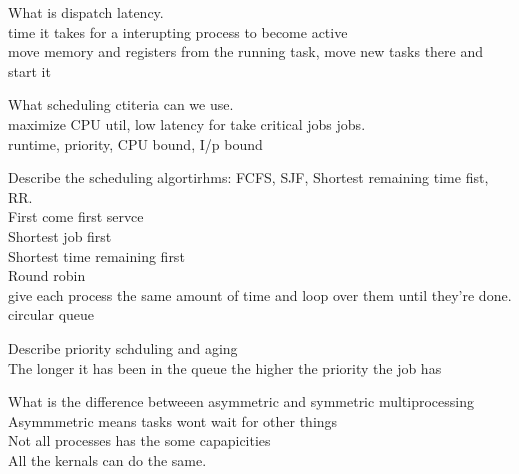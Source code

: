 \documentclass[a4paper,10pt,titlepage]{report}
\begin{document}
\vspace{5mm}

What is dispatch latency.\\
\hspace{10mm} time it takes for a interupting process to become active \\
\hspace{10mm} move memory and registers from the running task, move new tasks there and start it \\
\vspace{5mm}

What scheduling ctiteria can we use.\\
\hspace{10mm} maximize CPU util, low latency for take critical jobs jobs.\\
\hspace{10mm} runtime, priority, CPU bound, I/p bound \\
\vspace{5mm}

Describe the scheduling algortirhms: FCFS, SJF, Shortest remaining time fist, RR.\\
\hspace{10mm} First come first servce\\
\hspace{10mm} Shortest job first \\
\hspace{10mm} Shortest time remaining first \\
\hspace{10mm} Round robin\\
\hspace{10mm}give each process the same amount of time and loop over them until they're done. circular queue\\
\vspace{5mm}


Describe priority schduling and aging\\
\hspace{10mm} The longer it has been in the queue the higher the priority the job has\\
\vspace{5mm}

What is the difference betweeen asymmetric and symmetric multiprocessing\\
\hspace{10mm} Asymmmetric means tasks wont wait for other things \\
\hspace{10mm} Not all processes has the some capapicities\\
\hspace{10mm} All the kernals can do the same.\\ 
\vspace{5mm}
\end{document}
